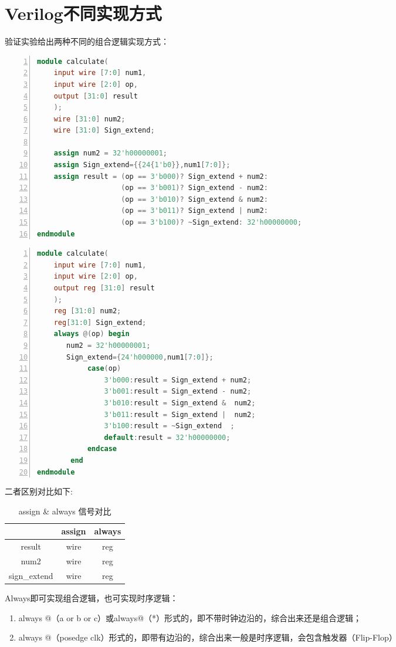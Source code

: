 \section{Verilog不同实现方式}
验证实验给出两种不同的组合逻辑实现方式：

\begin{lstlisting}[language=Verilog,label=lst:assign,caption=assign实现组合逻辑,numbers=left,xleftmargin=5em,xrightmargin=5em, aboveskip=2em]
module calculate(
    input wire [7:0] num1,
    input wire [2:0] op,
    output [31:0] result
    );
    wire [31:0] num2;
    wire [31:0] Sign_extend;
    
    assign num2 = 32'h00000001;
    assign Sign_extend={{24{1'b0}},num1[7:0]};
    assign result = (op == 3'b000)? Sign_extend + num2:
                    (op == 3'b001)? Sign_extend - num2:
                    (op == 3'b010)? Sign_extend & num2:
                    (op == 3'b011)? Sign_extend | num2:
                    (op == 3'b100)? ~Sign_extend: 32'h00000000;
endmodule
\end{lstlisting}


\begin{lstlisting}[language = Verilog,label=lst:always,caption=always实现组合逻辑,numbers=left,xleftmargin=5em,xrightmargin=5em, aboveskip=2em]
module calculate(
    input wire [7:0] num1,
    input wire [2:0] op,
    output reg [31:0] result
    );
    reg [31:0] num2;
    reg[31:0] Sign_extend;
    always @(op) begin
       num2 = 32'h00000001;
       Sign_extend={24'h000000,num1[7:0]};
            case(op)
                3'b000:result = Sign_extend + num2;
                3'b001:result = Sign_extend - num2; 
                3'b010:result = Sign_extend &  num2;
                3'b011:result = Sign_extend |  num2;
                3'b100:result = ~Sign_extend  ;          
                default:result = 32'h00000000;
            endcase
        end
endmodule
\end{lstlisting}

二者区别对比如下:

\begin{table}[htbp]
    \centering
    \begin{tabular}{c|c|c}
          \hline
          & assign & always  \\
          \hline
          result    & wire & reg \\
          num2      & wire  & reg \\
          sign\_extend & wire &  reg\\
          \hline
    \end{tabular}
    \caption{assign \& always 信号对比}
    \label{tab:sig_compare}
\end{table}
Always即可实现组合逻辑，也可实现时序逻辑：
\begin{enumerate}[(1)]
    \item always @（a or b or c）或always@（*）形式的，即不带时钟边沿的，综合出来还是组合逻辑；
    \item always @（posedge clk）形式的，即带有边沿的，综合出来一般是时序逻辑，会包含触发器（Flip-Flop）
\end{enumerate}


